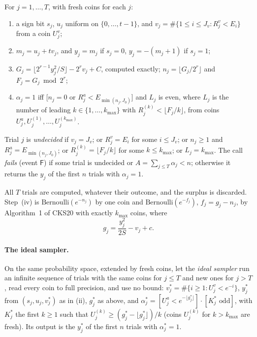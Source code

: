 \begin{definition}\label{def:budget}
For $j=1,\dots,T$, with fresh coins for each $j$:
\begin{enumerate}[nosep,label=(\roman*)]
  \item a sign bit $s_j$, $u_j$ uniform on $\{0,\dots,t-1\}$, and $v_j=\#\{1\le i\le J_v:R^v_j<E_i\}$ from a coin $U^v_j$;
  \item $m_j=u_j+tv_j$, and $y_j=m_j$ if $s_j=0$, $y_j=-(m_j+1)$ if $s_j=1$;
  \item $G_j=\lfloor2^{r-1}y_j^2/S\rfloor-2^rv_j+C$, computed exactly; $n_j=\lfloor G_j/2^r\rfloor$ and $F_j=G_j\bmod2^r$;
  \item $\alpha_j=1$ iff [$n_j=0$ or $R^a_j<E_{\min(n_j,J_0)}$] and $L_j$ is even, where $L_j$ is the number of leading $k\in\{1,\dots,k_{\max}\}$ with $R^{(k)}_j<\lfloor F_j/k\rfloor$, from coins $U^a_j,U^{(1)}_j,\dots,U^{(k_{\max})}_j$.
\end{enumerate}
Trial $j$ is \emph{undecided} if $v_j=J_v$; or $R^v_j=E_i$ for some $i\le J_v$; or $n_j\ge1$ and $R^a_j=E_{\min(n_j,J_0)}$; or $R^{(k)}_j=\lfloor F_j/k\rfloor$ for some $k\le k_{\max}$; or $L_j=k_{\max}$. The call \emph{fails} (event $\mathsf F$) if some trial is undecided or $A=\sum_{j\le T}\alpha_j<n$; otherwise it returns the $y_j$ of the first $n$ trials with $\alpha_j=1$.
\end{definition}

All $T$ trials are computed, whatever their outcome, and the surplus is discarded. Step~(iv) is $\mathrm{Bernoulli}(e^{-n_j})$ by one coin and $\mathrm{Bernoulli}(e^{-f_j})$, $f_j=g_j-n_j$, by Algorithm~1 of CKS20 with exactly $k_{\max}$ coins, where
\[
  g_j=\frac{y_j^2}{2S}-v_j+c .
\]

\paragraph{The ideal sampler.} On the same probability space, extended by fresh coins, let the \emph{ideal sampler} run an infinite sequence of trials with the same coins for $j\le T$ and new ones for $j>T$, read every coin to full precision, and use no bound: $v^*_j=\#\{i\ge1:U^v_j<e^{-i}\}$, $y^*_j$ from $(s_j,u_j,v^*_j)$ as in (ii), $g^*_j$ as above, and $\alpha^*_j=[U^a_j<e^{-\lfloor g^*_j\rfloor}]\cdot[K^*_j\text{ odd}]$, with $K^*_j$ the first $k\ge1$ such that $U^{(k)}_j\ge(g^*_j-\lfloor g^*_j\rfloor)/k$ (coins $U^{(k)}_j$ for $k>k_{\max}$ are fresh). Its output is the $y^*_j$ of the first $n$ trials with $\alpha^*_j=1$.

